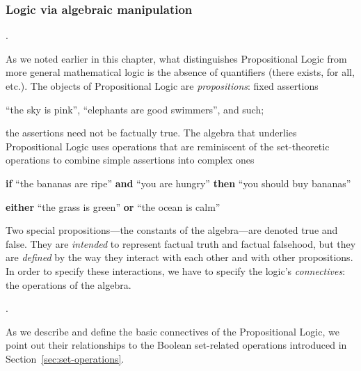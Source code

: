 \subsubsection{Logic via algebraic manipulation}

.

\noindent
As we noted earlier in this chapter, what distinguishes Propositional
Logic from more general mathematical logic is the absence of
quantifiers ({\sc there exists}, {\sc for all}, etc.).  The objects of
Propositional Logic are {\it propositions}: fixed assertions

\smallskip

``the sky is pink'', ``elephants are good swimmers'', and such;

\smallskip

\noindent 
the assertions need not be factually true.  The algebra that underlies
Propositional Logic uses operations that are reminiscent of the
set-theoretic operations to combine simple assertions into complex
ones

\smallskip

{\bf if} ``the bananas are ripe'' {\bf and} ``you are hungry'' {\bf then}
 ``you should buy bananas''

\smallskip

{\bf either} ``the grass is green'' {\bf or} ``the ocean is calm''

\smallskip

\noindent
Two special propositions---the constants of the algebra---are denoted
{\sc true} and {\sc false}.  They are {\em intended} to represent factual
truth and factual falsehood, but they are {\em defined} by the way
they interact with each other and with other propositions.  In order
to specify these interactions, we have to specify the logic's {\it
  connectives}: the operations of the algebra.

\bigskip

.

\noindent
As we describe and define the basic connectives of the Propositional
Logic, we point out their relationships to the Boolean set-related
operations introduced in Section~\ref{sec:set-operations}.

\medskip

